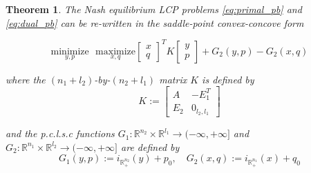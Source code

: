 \documentclass[12pt]{article}
\newtheorem{theorem}{Theorem} \newtheorem{lemma}[theorem]{Lemma}
\begin{document}
\begin{theorem}
  The Nash equilibrium LCP problems \eqref{eq:primal_pb} and \eqref{eq:dual_pb} can be re-written in the saddle-point convex-concove form
  
  \begin{equation}
    \underset{y, p}{\text{minimize}}\text{ }\underset{x, q}{\text{maximize}}
           {\begin{bmatrix}x\\q\end{bmatrix}^TK\begin{bmatrix}y\\p\end{bmatrix} + G_2(y, p) - G_2(x, q)}
           \label{eq:unconstrained_pb}
  \end{equation}

  where the $(n_1 + l_2)$-by-$(n_2 + l_1)$ matrix $K$ is defined by
  \begin{equation}
    K :=
    \left[
      \begin{array}{c|c}
        A & -E_1^T \\ \hline
        E_2 & 0_{l_2, l_1}
      \end{array}
      \right]
\end{equation}

and the p.c.l.s.c functions $G_1: \mathbb{R}^{n_2} \times \mathbb{R}^{l_1} \rightarrow (-\infty, +\infty]$ and \\$G_2: \mathbb{R}^{n_1} \times \mathbb{R}^{l_2} \rightarrow (-\infty, +\infty]$ are defined by
  \begin{equation}
      G_1(y, p) := i_{\mathbb{R}^{n_2}_+}(y) + p_0, \hspace{1em} G_2(x, q) := i_{\mathbb{R}^{n_1}_+}(x) + q_0
    \label{eq:things}
  \end{equation}
  

  \label{thm:pd}
\end{theorem}
\end{document}
